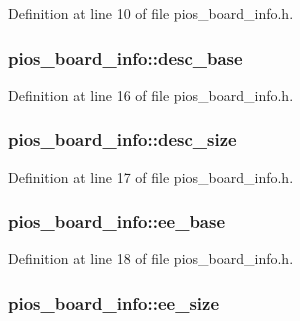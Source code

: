 Definition at line 10 of file pios\-\_\-board\-\_\-info.\-h.

\hypertarget{structpios__board__info_abf65ae5cf522219445a2fc436a771365}{
\subsubsection[{desc\-\_\-base}]{ pios\-\_\-board\-\_\-info\-::desc\-\_\-base}}\label{structpios__board__info_abf65ae5cf522219445a2fc436a771365}


Definition at line 16 of file pios\-\_\-board\-\_\-info.\-h.

\hypertarget{structpios__board__info_aab7aa8138d0df454158a720741756931}{
\subsubsection[{desc\-\_\-size}]{ pios\-\_\-board\-\_\-info\-::desc\-\_\-size}}\label{structpios__board__info_aab7aa8138d0df454158a720741756931}


Definition at line 17 of file pios\-\_\-board\-\_\-info.\-h.

\hypertarget{structpios__board__info_a67ef167840d1d40c2ea296544f664c22}{
\subsubsection[{ee\-\_\-base}]{ pios\-\_\-board\-\_\-info\-::ee\-\_\-base}}\label{structpios__board__info_a67ef167840d1d40c2ea296544f664c22}


Definition at line 18 of file pios\-\_\-board\-\_\-info.\-h.

\hypertarget{structpios__board__info_a3ffc56de2b782e6e19c33e68ffd9716d}{
\subsubsection[{ee\-\_\-size}]{ pios\-\_\-board\-\_\-info\-::ee\-\_\-size}}\label{structpios__board__info_a3ffc56de2b782e6e19c33e68ffd9716d}


